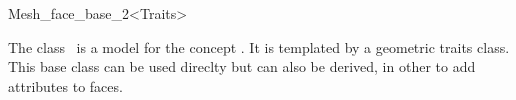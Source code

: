 \begin{ccRefClass}{Mesh_face_base_2<Traits>}

\ccDefinition

The class \ccRefName\ is a model for the concept
. It is templated by a geometric traits
class. This base class can be used direclty but can also be derived,
in other to add attributes to faces.


\ccIsModel
{}
\end{ccRefClass}
